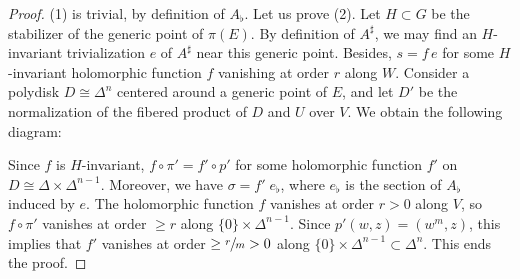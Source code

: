 \documentclass[JEP,XML,SOM,Unicode, NoEqCountersInSection,NoFloatCountersInSection,published]{cedram}
\let\ts\textstyle
\theoremstyle{theorem}
\theoremstyle{definition}
\begin{document}
\begin{proof}
(1) is trivial, by definition of \(A_{\flat}\). Let us prove (2). Let $H \subset G$ be the stabilizer of the generic point of $\pi(E)$. By definition of $A^\sharp$, we may find an $H$-invariant trivialization $e$ of $A^\sharp$ near this generic point. Besides, $s = f \, {e}$ for some $H$-invariant holomorphic function $f$ vanishing at order $r$ along $W$. Consider a polydisk $D \cong \Delta^n$ centered around a generic point of $E$, and let $D'$ be the normalization of the fibered product of $D$ and $U$ over $V$. We obtain the following diagram:
\begin{center}
\end{center}
Since $f$ is $H$-invariant, $f \circ \pi' = f' \circ p'$ for some holomorphic function $f'$ on $D \cong \Delta \times \Delta^{n-1}$. Moreover, we have $\sigma = f' \; e_{\flat}$, where $e_{\flat}$ is the section of $A_\flat$ induced by $e$. The holomorphic function $f$ vanishes at order $r > 0$ along $V$, so $f \circ \pi'$ vanishes at order $\geq r$ along $\{ 0 \} \times \Delta^{n-1}$. Since $p'(w, z) = (w^m, z)$, this implies that $f'$ vanishes at order $\geq \sfrac{r}{m} > 0$ along $\{ 0 \} \times \Delta^{n-1} \subset \Delta^n$. This ends the proof.
\end{proof}
\end{document}
